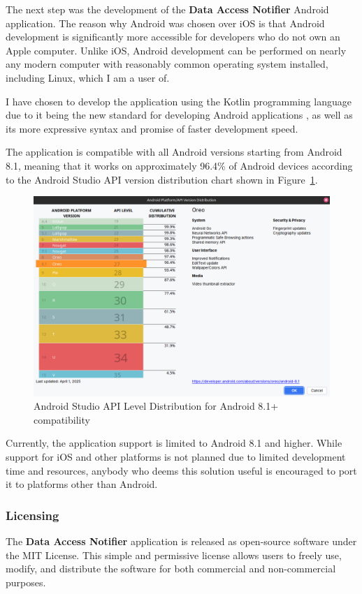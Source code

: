 The next step was the development of the \textbf{Data Access Notifier} Android application. The reason why Android was chosen over iOS is that Android development is significantly more accessible for developers who do not own an Apple computer. Unlike iOS, Android development can be performed on nearly any modern computer with reasonably common operating system installed, including Linux, which I am a user of.

I have chosen to develop the application using the Kotlin programming language due to it being the new standard for developing Android applications \cite{kotlin-first}, as well as its more expressive syntax and promise of faster development speed.

The application is compatible with all Android versions starting from Android 8.1, meaning that it works on approximately 96.4\% of Android devices according to the Android Studio API version distribution chart shown in Figure~\ref{fig:android-api-distribution}.

\begin{figure}[H]
\centering
\includegraphics[width=450px]{english/figures/Screenshot from 2025-08-11 22-58-16.png}
\caption{Android Studio API Level Distribution for Android 8.1+ compatibility}
\label{fig:android-api-distribution}
\end{figure}

Currently, the application support is limited to Android 8.1 and higher. While support for iOS and other platforms is not planned due to limited development time and resources, anybody who deems this solution useful is encouraged to port it to platforms other than Android.

\subsubsection{Licensing}
The \textbf{Data Access Notifier} application is released as open-source software under the MIT License. This simple and permissive license allows users to freely use, modify, and distribute the software for both commercial and non-commercial purposes. 

